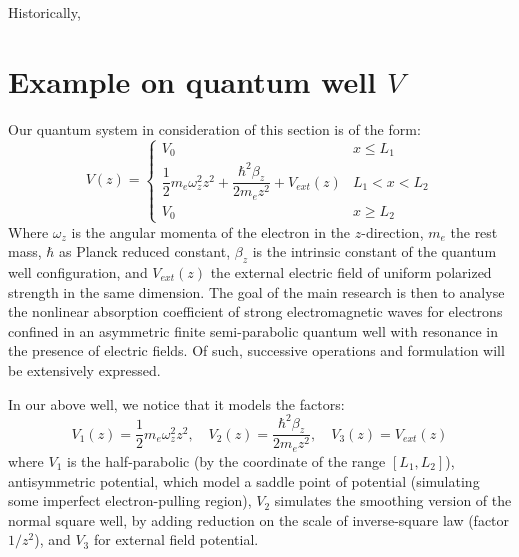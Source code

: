 \documentclass{article}
\begin{document}
Historically, 

\clearpage

\section{Example on quantum well $V$}

Our quantum system in consideration of this section is of the form: 
\begin{equation}\label{eq:quantum_well_main_2}
    V(z)=\begin{cases}
        V_{0} & x \leq L_{1} \\
        \dfrac{1}{2}m_{{e}}\omega_{z}^{2}z^{2}+ \dfrac{\hbar^{2}\beta_{z}}{2m_{e}z^{2}} + V_{ext}(z) & L_{1} < x < L_{2}\\
        V_{0} & x \geq L_{2}
    \end{cases}
\end{equation}
Where $\omega_{z}$ is the angular momenta of the electron in the $z$-direction, $m_{e}$ the rest mass, $\hbar$ as Planck reduced constant, $\beta_{z}$ is the intrinsic constant of the quantum well configuration, and $V_{ext}(z)$ the external electric field of uniform polarized strength in the same dimension. The goal of the main research is then to analyse the nonlinear absorption coefficient of strong electromagnetic waves for electrons confined in an asymmetric finite semi-parabolic quantum well with resonance in the presence of electric fields. Of such, successive operations and formulation will be extensively expressed. 

In our above well, we notice that it models the factors: 
\begin{equation}
    V_{1}(z)=\frac{1}{2} m_{{e}}\omega_{z}^{2}z^{2},\quad V_{2}(z)=\frac{\hbar^{2}\beta_{z}}{2m_{e}z^{2}},\quad V_{3}(z) = V_{ext}(z)
\end{equation}
where $V_{1}$ is the half-parabolic (by the coordinate of the range $[L_{1},L_{2}]$), antisymmetric potential, which model a saddle point of potential (simulating some imperfect electron-pulling region), $V_{2}$ simulates the smoothing version of the normal square well, by adding reduction on the scale of inverse-square law (factor $1/z^{2}$), and $V_{3}$ for external field potential. 
\end{document}
